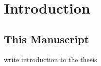 \chapter{Introduction}

\section{This Manuscript}
\pg
write introduction to the thesis


\newpage

\newpage
